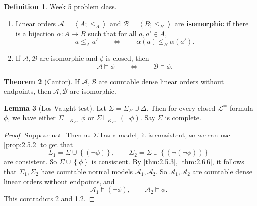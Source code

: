 \documentclass{article}
\newcommand{\A}{\mathcal{A}}
\newcommand{\B}{\mathcal{B}}
\renewcommand{\L}{\mathcal{L}}
\newcommand{\rb}[1]{\left( #1 \right)}
\newcommand{\cb}[1]{\left\{ #1 \right\}}
\newcommand{\ab}[1]{\left\langle #1 \right\rangle}
\newcommand{\notb}[1]{\rb{\neg #1}}
\theoremstyle{definition}\newtheorem{definition}{Definition}[subsection]
\theoremstyle{definition}\newtheorem{remark1}[definition]{Remark}
\theoremstyle{definition}\newtheorem{example1}[definition]{Example}
\theoremstyle{definition}\newtheorem*{remark2}{Remark}
\theoremstyle{definition}\newtheorem*{example2}{Example}
\theoremstyle{definition}\newtheorem*{note}{Note}
\theoremstyle{definition}\newtheorem*{notation}{Notation}
\newtheorem{lemma}[definition]{Lemma}
\newtheorem{theorem}[definition]{Theorem}
\begin{document}
\begin{definition}
\label{def:2.7.3}
Week 5 problem class.
\begin{enumerate}
\item Linear orders $ \A = \ab{A; \le_A} $ and $ \B = \ab{B; \le_B} $ are \textbf{isomorphic} if there is a bijection $ \alpha : A \to B $ such that for all $ a, a' \in A $,
$$ a \le_A a' \qquad \iff \qquad \alpha\rb{a} \le_B \alpha\rb{a'}. $$
\item If $ \A, \B $ are isomorphic and $ \phi $ is closed, then
$$ \A \vDash \phi \qquad \iff \qquad \B \vDash \phi. $$
\end{enumerate}
\end{definition}

\begin{theorem}[Cantor]
\label{thm:2.7.4}
If $ \A, \B $ are countable dense linear orders without endpoints, then $ \A, \B $ are isomorphic.
\end{theorem}

\begin{lemma}[Los-Vaught test]
\label{lem:2.7.5}
Let $ \Sigma = \Sigma_E \cup \Delta $. Then for every closed $ \L^= $-formula $ \phi $, we have either $ \Sigma \vdash_{K_{\L^=}} \phi $ or $ \Sigma \vdash_{K_{\L^=}} \notb{\phi} $. Say $ \Sigma $ is complete.
\end{lemma}

\begin{proof}
Suppose not. Then as $ \Sigma $ has a model, it is consistent, so we can use \ref{prop:2.5.2} to get that
$$ \Sigma_1 = \Sigma \cup \cb{\notb{\phi}}, \qquad \Sigma_2 = \Sigma \cup \cb{\notb{\notb{\phi}}} $$
are consistent. So $ \Sigma \cup \cb{\phi} $ is consistent. By \ref{thm:2.5.3}, \ref{thm:2.6.6}, it follows that $ \Sigma_1, \Sigma_2 $ have countable normal models $ \A_1, \A_2 $. So $ \A_1, \A_2 $ are countable dense linear orders without endpoints, and
$$ \A_1 \vDash \notb{\phi}, \qquad \A_2 \vDash \phi. $$
This contradicts \ref{thm:2.7.4} and \ref{def:2.7.3}.$ 2 $.
\end{proof}
\end{document}
